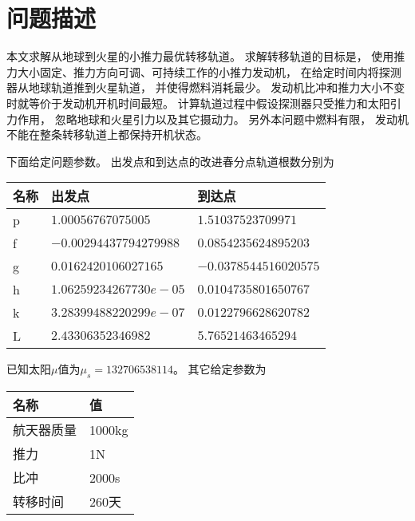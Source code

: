\section{问题描述}
本文求解从地球到火星的小推力最优转移轨道。
求解转移轨道的目标是，
使用推力大小固定、推力方向可调、可持续工作的小推力发动机，
在给定时间内将探测器从地球轨道推到火星轨道，
并使得燃料消耗最少。
发动机比冲和推力大小不变时就等价于发动机开机时间最短。
计算轨道过程中假设探测器只受推力和太阳引力作用，
忽略地球和火星引力以及其它摄动力。
另外本问题中燃料有限，
发动机不能在整条转移轨道上都保持开机状态。

下面给定问题参数。
出发点和到达点的改进春分点轨道根数分别为
\begin{center}\begin{tabular}{lll}
    \toprule
    名称 & 出发点 & 到达点 \\
    \midrule
    p & $1.00056767075005     $ & $1.51037523709971    $ \\
    f & $-0.00294437794279988 $ & $0.0854235624895203  $ \\
    g & $0.0162420106027165   $ & $-0.0378544516020575 $ \\
    h & $1.06259234267730e-05 $ & $0.0104735801650767  $ \\
    k & $3.28399488220299e-07 $ & $0.0122796628620782  $ \\
    L & $2.43306352346982     $ & $5.76521463465294    $ \\
    \bottomrule
\end{tabular}\end{center}
已知太阳$\mu$值为$\mu_s=132706538114$。
其它给定参数为
\begin{center}\begin{tabular}{ll}
    \toprule
    名称 & 值 \\
    \midrule
    航天器质量 & 1000kg \\
    推力 & 1N \\
    比冲 & 2000s \\
    转移时间 & 260天 \\
    \bottomrule
\end{tabular}\end{center}


